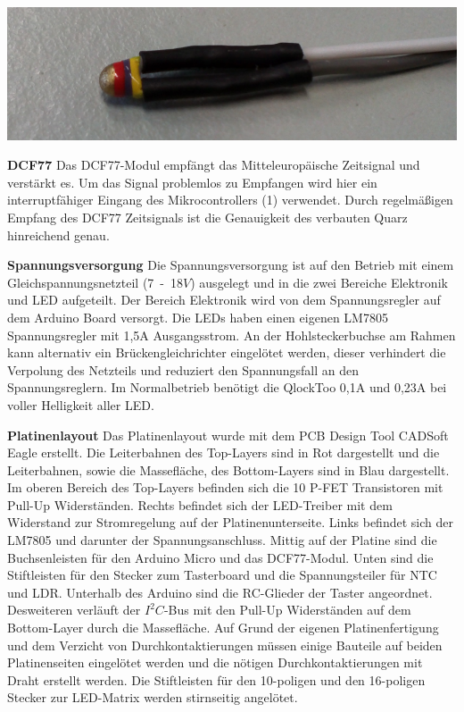 \begin{multicols}{2}
{}

{
\centering
\includegraphics[width=0.9\columnwidth]{Abbildungen/Elektronik/NTC}

}

\textbf{DCF77} Das DCF77-Modul empfängt das Mitteleuropäische Zeitsignal und verstärkt es. Um das Signal problemlos zu Empfangen wird hier ein interruptfähiger Eingang des Mikrocontrollers (1) verwendet. Durch regelmäßigen Empfang des DCF77 Zeitsignals ist die Genauigkeit des verbauten Quarz hinreichend genau.\newline

\textbf{Spannungsversorgung} Die Spannungsversorgung ist auf den Betrieb mit einem Gleichspannungsnetzteil (7~-~18$V$) ausgelegt und in die zwei Bereiche Elektronik und LED aufgeteilt. Der Bereich Elektronik wird von dem Spannungsregler auf dem Arduino Board versorgt. Die LEDs haben einen eigenen LM7805 Spannungsregler mit 1,5A Ausgangsstrom. An der Hohlsteckerbuchse am Rahmen kann alternativ ein Brückengleichrichter eingelötet werden, dieser verhindert die Verpolung des Netzteils und reduziert den Spannungsfall an den Spannungsreglern. Im Normalbetrieb benötigt die QlockToo 0,1A und 0,23A bei voller Helligkeit aller LED.


\textbf{Platinenlayout} Das Platinenlayout wurde mit dem PCB Design Tool CADSoft Eagle erstellt. Die Leiterbahnen des Top-Layers sind in Rot dargestellt und die Leiterbahnen, sowie die Massefläche, des Bottom-Layers sind in Blau dargestellt. Im oberen Bereich des Top-Layers befinden sich die 10 P-FET Transistoren mit  Pull-Up Widerständen. Rechts befindet sich der LED-Treiber mit dem Widerstand zur Stromregelung auf der Platinenunterseite. Links befindet sich der LM7805 und darunter der Spannungsanschluss. Mittig auf der Platine sind die Buchsenleisten für den Arduino Micro und das DCF77-Modul. Unten sind die Stiftleisten für den Stecker zum Tasterboard und die Spannungsteiler für NTC und LDR. Unterhalb des Arduino sind die RC-Glieder der Taster angeordnet. Desweiteren verläuft der $I^{2}C$-Bus mit den Pull-Up Widerständen auf dem Bottom-Layer durch die Massefläche. Auf Grund der eigenen Platinenfertigung und dem Verzicht von Durchkontaktierungen müssen einige Bauteile auf beiden Platinenseiten eingelötet werden und die nötigen Durchkontaktierungen mit Draht erstellt werden. Die Stiftleisten für den 10-poligen und den 16-poligen Stecker zur LED-Matrix werden stirnseitig angelötet.



\end{multicols}
